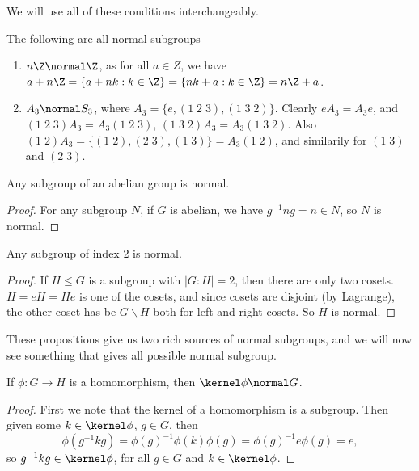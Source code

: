 \documentclass[a4]{scrreprt}
\begin{document}
We will use all of these conditions interchangeably.

\begin{example}
	The following are all normal subgroups
	\begin{enumerate}[label=(\roman*)]
		\item $n\Z \normal \Z$, as for all $a \in Z$, we have
		$a + n\Z = \{a + nk : k \in \Z\} = \{nk + a : k \in \Z\} = n\Z + a$.
		\item 
		$A_3 \normal S_3$, where $A_3 = \{e, (1\; 2\; 3), (1\; 3\; 2)\}$. Clearly $eA_3 = A_3 e$, and $(1\;2\;3)A_3 = A_3 (1\; 2\; 3)$, $(1\; 3\; 2)A_3 = A_3 (1\; 3\; 2)$. Also $(1\; 2)A_3 = \{(1\; 2), (2\; 3), (1\; 3)\} = A_3(1\; 2)$, and similarily for $(1\;3)$ and $(2\; 3)$.
	\end{enumerate}
\end{example}

\begin{proposition}
	Any subgroup of an abelian group is normal.
\end{proposition}
\begin{proof}
	For any subgroup $N$,
	if $G$ is abelian, we have $g^{-1}n g = n \in N$, so $N$ is normal.
\end{proof}

\begin{proposition}
	Any subgroup of index 2 is normal.
\end{proposition}
\begin{proof}
	If $H \leq G$ is a subgroup with $|G:H| = 2$, then there are only two cosets. $H = eH = He$ is one of the cosets, and since cosets are disjoint (by Lagrange), the other coset has be $G\backslash H$ both for left and right cosets. So $H$ is normal.
\end{proof}

These propositions give us two rich sources of normal subgroups, and we will now see something that gives all possible normal subgroup.

\begin{proposition}
	If $\phi : G \rightarrow H$ is a homomorphism, then $\kernel \phi \normal G$.
\end{proposition}
\begin{proof}
	First we note that the kernel of a homomorphism is a subgroup. Then given some $k \in \kernel \phi$, $g \in G$, then
	$$
	\phi(g^{-1} k g) = \phi(g)^{-1} \phi(k) \phi(g) = \phi(g)^{-1} e \phi(g) = e,
	$$
	so $g^{-1} k g \in \kernel \phi$, for all $g \in G$ and $k \in \kernel \phi$.
\end{proof}
\end{document}
